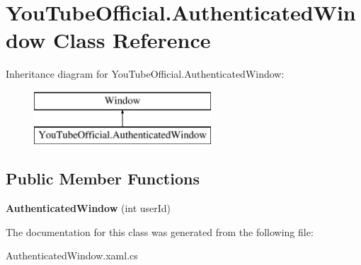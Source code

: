 \hypertarget{class_you_tube_official_1_1_authenticated_window}{}\section{You\+Tube\+Official.\+Authenticated\+Window Class Reference}
\label{class_you_tube_official_1_1_authenticated_window}
Inheritance diagram for You\+Tube\+Official.\+Authenticated\+Window\+:\begin{figure}[H]
\begin{center}
\leavevmode
\includegraphics[height=2.000000cm]{class_you_tube_official_1_1_authenticated_window}
\end{center}
\end{figure}
\subsection*{Public Member Functions}
\begin{DoxyCompactItemize}
\item 
\mbox{\label{class_you_tube_official_1_1_authenticated_window_a2535a985d581902d51bb2c05030b62bd}} 
{\bfseries Authenticated\+Window} (int user\+Id)
\end{DoxyCompactItemize}


The documentation for this class was generated from the following file\+:\begin{DoxyCompactItemize}
\item 
Authenticated\+Window.\+xaml.\+cs\end{DoxyCompactItemize}
